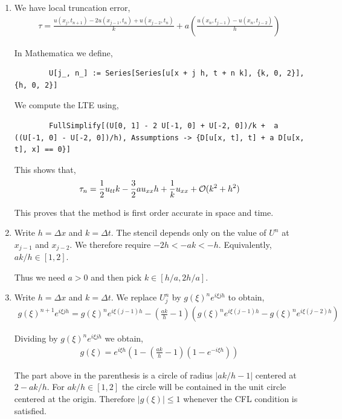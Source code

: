 \documentclass[10pt]{article}
\begin{document}
\begin{solution}[Solution]
\begin{enumerate}[label=(\alph*)]
    \item We have local truncation error,
    \begin{align*}
        \tau = \frac{u(x_j,t_{n+1})-2u(x_{j-1},t_n)+u(x_{j-2},t_n)}{k} + a \left( \frac{u(x_n,t_{j-1})-u(x_n,t_{j-2})}{h} \right)
    \end{align*}
        
    In Mathematica we define,
    \begin{lstlisting}
        U[j_, n_] := Series[Series[u[x + j h, t + n k], {k, 0, 2}], {h, 0, 2}]
    \end{lstlisting}
    
    We compute the LTE using,
    \begin{lstlisting}
        FullSimplify[(U[0, 1] - 2 U[-1, 0] + U[-2, 0])/k +  a ((U[-1, 0] - U[-2, 0])/h), Assumptions -> {D[u[x, t], t] + a D[u[x, t], x] == 0}]
    \end{lstlisting}
    
    This shows that,
    \begin{align*}
        \tau_n = \frac{1}{2} u_{tt} k - \frac{3}{2} a u_{xx} h + \frac{1}{k} u_{xx} + \mathcal{O}(k^2 + h^2)
    \end{align*}

    This proves that the method is first order accurate in space and time. 

    \item Write \(  h = \Delta x \) and \( k = \Delta t \). The stencil depends only on the value of \( U^n \) at \( x_{j-1} \) and \( x_{j-2} \). We therefore require \( -2h < -ak < -h \). Equivalently, \( ak/h \in [1,2] \).


        Thus we need \( a>0 \) and then pick \( k \in[h/a, 2h/a] \).

    \item Write \(  h = \Delta x \) and \( k = \Delta t \). We replace \( U_j^n \) by \( g(\xi)^n e^{i\xi j h} \) to obtain,
        \begin{align*}
            g(\xi)^{n+1} e^{i\xi j h} = g(\xi)^n e^{i\xi(j-1)h} - \left( \frac{a k}{h}-1 \right) \left( g(\xi)^n e^{i\xi (j-1) h} - g(\xi)^n e^{i\xi (j-2) h} \right)
        \end{align*}
        
        Dividing by \( g(\xi)^n e^{i\xi j h} \) we obtain,
        \begin{align*}
            g(\xi) = e^{i\xi h} \left( 1 - \left( \frac{ak}{h}-1 \right) \left( 1-e^{-i\xi h} \right) \right)
        \end{align*}

        The part above in the parenthesis is a circle of radius \( |ak/h-1| \) centered at \( 2-ak/h \). For \( ak/h \in[1,2] \) the circle will be contained in the unit circle centered at the origin. Therefore \( |g(\xi)| \leq 1 \) whenever the CFL condition is satisfied.
        
\end{enumerate}
\end{solution}
\end{document}
